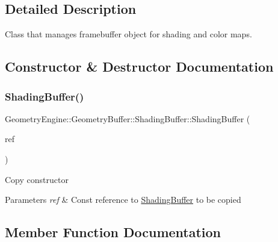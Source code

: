 \subsection{Detailed Description}
Class that manages framebuffer object for shading and color maps. 

\subsection{Constructor \& Destructor Documentation}
\mbox{\label{class_geometry_engine_1_1_geometry_buffer_1_1_shading_buffer_af5039da17d98b71245360dc575b14964}} 
\subsubsection{\texorpdfstring{ShadingBuffer()}{ShadingBuffer()}}
{\footnotesize\ttfamily Geometry\+Engine\+::\+Geometry\+Buffer\+::\+Shading\+Buffer\+::\+Shading\+Buffer (\begin{DoxyParamCaption}\item[{const \mbox{\hyperlink{class_geometry_engine_1_1_geometry_buffer_1_1_shading_buffer}{Shading\+Buffer}} \&}]{ref }\end{DoxyParamCaption})}

Copy constructor 
\begin{DoxyParams}{Parameters}
{\em ref} & Const reference to \mbox{\hyperlink{class_geometry_engine_1_1_geometry_buffer_1_1_shading_buffer}{Shading\+Buffer}} to be copied \\
\hline
\end{DoxyParams}


\subsection{Member Function Documentation}
\mbox{\label{class_geometry_engine_1_1_geometry_buffer_1_1_shading_buffer_adaf685676711e22a36cd5d10b6fd7752}} 
